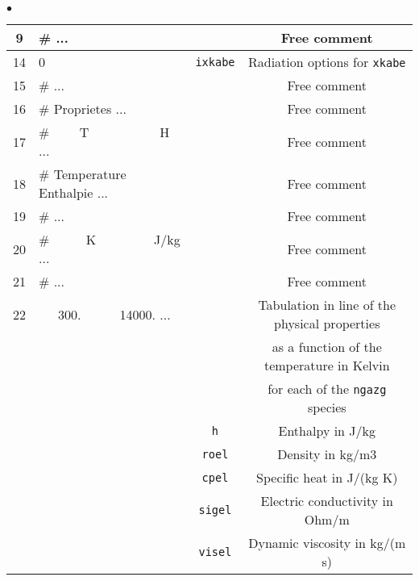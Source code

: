 {{\begin{list}{$\bullet$}{}
\begin{table}[htbp]
\begin{center}
{\begin{tabular}{|c|l|c|c|}
  9     &\#                            ... &           & Free comment                                       \\ \hline
 14     &        0           & \texttt{ixkabe\index{ixkabe}} & Radiation options for \texttt{xkabe\index{xkabe}}   \\ \hline
 15     &\#                            ... &           & Free comment                                       \\ \hline
 16     &\#  Proprietes                ... &           & Free comment                                       \\ \hline
 17     &\#  ~~~~T~~~~~~~~~~~H         ... &           & Free comment                                       \\ \hline
 18     &\#  Temperature  Enthalpie    ... &           & Free comment                                       \\ \hline
 19     &\#                            ... &           & Free comment                                       \\ \hline
 20     &\#  ~~~~~K~~~~~~~~~J/kg       ... &           & Free comment                                       \\ \hline
 21     &\#                            ... &           & Free comment                                       \\ \hline
 22     &    ~~~300.~~~~~~14000.       ... &           & Tabulation in line of the physical properties      \\
        &                                  &           & as a function of the temperature in Kelvin         \\
        &                                  &           & for each of the \texttt{ngazg} species             \\
        &                    &    \texttt{h}                    & Enthalpy in J/kg                                   \\
        &                    &    \texttt{roel}                 & Density in kg/m3                                   \\
        &                    &    \texttt{cpel}                 & Specific heat in J/(kg K)                          \\
        &                    &    \texttt{sigel}                & Electric conductivity in Ohm/m                     \\
        &                    &    \texttt{visel}                & Dynamic viscosity in kg/(m s)                      \\

\end{tabular}}
\end{center}
\end{table}
\end{list}}}
